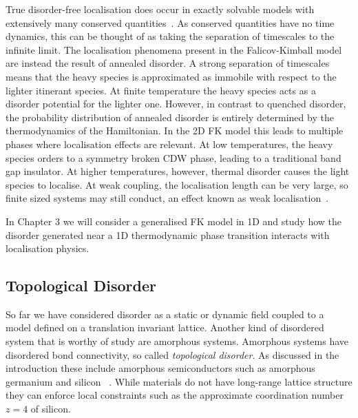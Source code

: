 True disorder-free localisation does occur in exactly solvable models with extensively many conserved quantities~\autocite{smithDisorderFreeLocalization2017}. As conserved quantities have no time dynamics, this can be thought of as taking the separation of timescales to the infinite limit. The localisation phenomena present in the Falicov-Kimball model are instead the result of annealed disorder. A strong separation of timescales means that the heavy species is approximated as immobile with respect to the lighter itinerant species. At finite temperature the heavy species acts as a disorder potential for the lighter one. However, in contrast to quenched disorder, the probability distribution of annealed disorder is entirely determined by the thermodynamics of the Hamiltonian. In the 2D FK model this leads to multiple phases where localisation effects are relevant. At low temperatures, the heavy species orders to a symmetry broken CDW phase, leading to a traditional band gap insulator. At higher temperatures, however, thermal disorder causes the light species to localise. At weak coupling, the localisation length can be very large, so finite sized systems may still conduct, an effect known as weak localisation~\autocite{antipovInteractionTunedAndersonMott2016}.

In Chapter 3 we will consider a generalised FK model in 1D and study how the disorder generated near a 1D thermodynamic phase transition interacts with localisation physics.

\hypertarget{topological-disorder}{%
\subsection{Topological Disorder}\label{topological-disorder}}

So far we have considered disorder as a static or dynamic field coupled to a model defined on a translation invariant lattice. Another kind of disordered system that is worthy of study are amorphous systems. Amorphous systems have disordered bond connectivity, so called \emph{topological disorder}. As discussed in the introduction these include amorphous semiconductors such as amorphous germanium and silicon ~\autocite{Yonezawa1983,zallen2008physics,Weaire1971,betteridge1973possible}. While materials do not have long-range lattice structure they can enforce local constraints such as the approximate coordination number \(z = 4\) of silicon.

